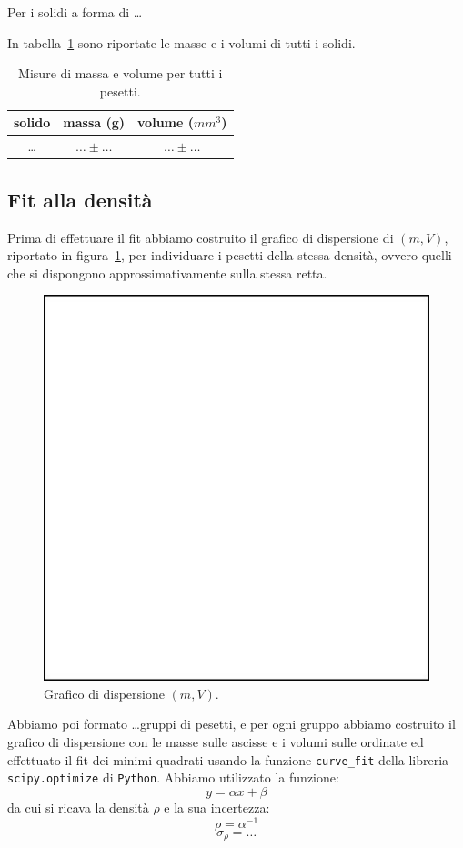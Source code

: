 \documentclass[a4paper]{article}
\begin{document}
Per i solidi a forma di \ldots

In tabella~\ref{tab:m_V} sono riportate le masse e i volumi di tutti i solidi.

\begin{table}[]
    \centering
    \begin{tabular}{c|c|c}
      solido   & massa (g)  & volume ($mm^3$)\\
      \hline
       \ldots & $\ldots \pm \ldots$ & $\ldots \pm \ldots$\\
    \end{tabular}
    \caption{Misure di massa e volume per tutti i pesetti.}
    \label{tab:m_V}
\end{table}

\subsection{Fit alla densit\`a}\label{sec:fit}

Prima di effettuare il fit abbiamo costruito il grafico di dispersione di $(m,V)$, riportato in figura~\ref{fig:dispersione},
per individuare i pesetti della stessa densit\`a, ovvero quelli che si dispongono approssimativamente sulla stessa retta.

\begin{figure}
    \centering
     \includegraphics[width=0.5\linewidth]{blankfig.pdf}
    \caption{Grafico di dispersione $(m,V)$.}
    \label{fig:dispersione}
\end{figure}

Abbiamo poi formato \ldots gruppi di pesetti, e per ogni gruppo abbiamo costruito il grafico di
dispersione con le masse sulle ascisse e i volumi sulle ordinate ed effettuato il fit dei minimi
quadrati usando la funzione \verb|curve_fit| della libreria \verb|scipy.optimize| di 
\verb|Python|. Abbiamo utilizzato la funzione:
\begin{equation}
    y = \alpha x + \beta
\end{equation}
da cui si ricava la densit\`a $\rho$ e la sua incertezza:
\begin{equation}
    \rho = \alpha^{-1}
\end{equation}
\begin{equation}
    \sigma_{\rho} = \ldots
\end{equation}
\end{document}
